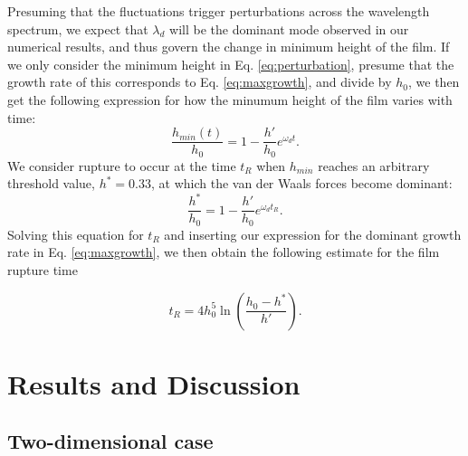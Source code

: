 \documentclass[
 onecolumn,
 amsmath,amssymb,
floatfix,superscriptaddress
]{revtex4-2}
\begin{document}
Presuming that the fluctuations trigger perturbations across the wavelength spectrum, we expect that $\lambda_d$ will be the dominant mode observed in our numerical results, and thus govern the change in minimum height of the film. If we only consider the minimum height in Eq. \eqref{eq:perturbation}, presume that the growth rate of this corresponds to Eq. \eqref{eq:maxgrowth}, and divide by $h_0$, we then get the following expression for how the minumum height of the film  varies with time:
\begin{equation}\label{eq:hminexpdev}
\frac{h_{min}(t)}{h_0}=1-\frac{h'}{h_0}e^{\omega _d t}.
\end{equation}
We consider rupture to occur at the time $t_R$ when $h_{min}$ reaches an arbitrary threshold value, $h^{*}=0.33$, at which the van der Waals forces become dominant:
\begin{equation}\label{eq:hstarexp}
\frac{h^{*}}{h_0}=1-\frac{h'}{h_0}e^{\omega _d t_R}.
\end{equation}
Solving this equation for $t_R$ and inserting our expression for the dominant growth rate in Eq. \eqref{eq:maxgrowth}, we then obtain the following estimate for the film rupture time 

\begin{equation} \label{eq:tRpred}
t_R=4h_0^5\ln\left(\frac{h_0-h^*}{h'}\right).
\end{equation}

\section{Results and Discussion}
\label{sec:resultater}

\subsection{Two-dimensional case}\label{subsec:2Dresults}
\end{document}
